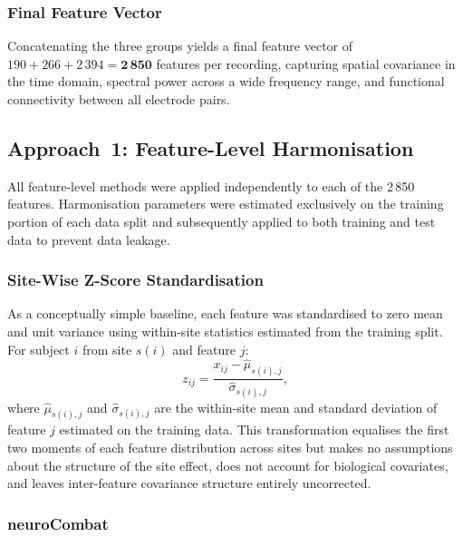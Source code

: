 \documentclass[preprint,12pt]{elsarticle}
\begin{document}
\subsubsection{Final Feature Vector}

Concatenating the three groups yields a final feature vector of
$190 + 266 + 2\,394 = \mathbf{2\,850}$ features per recording,
capturing spatial covariance in the time domain, spectral power
across a wide frequency range, and functional connectivity between
all electrode pairs.

\subsection{Approach~1: Feature-Level Harmonisation}
\label{subsec:approach1}

All feature-level methods were applied independently to each of the
2\,850 features.
Harmonisation parameters were estimated exclusively on the training
portion of each data split and subsequently applied to both training
and test data to prevent data leakage.

\subsubsection{Site-Wise Z-Score Standardisation}
\label{subsubsec:sitewise}

As a conceptually simple baseline, each feature was standardised to
zero mean and unit variance using within-site statistics estimated
from the training split.
For subject $i$ from site $s(i)$ and feature $j$:
\begin{equation}
  z_{ij} = \frac{x_{ij} - \hat{\mu}_{s(i),j}}
                {\hat{\sigma}_{s(i),j}},
  \label{eq:sitewise}
\end{equation}
where $\hat{\mu}_{s(i),j}$ and $\hat{\sigma}_{s(i),j}$ are the
within-site mean and standard deviation of feature $j$ estimated on
the training data.
This transformation equalises the first two moments of each feature
distribution across sites but makes no assumptions about the
structure of the site effect, does not account for biological
covariates, and leaves inter-feature covariance structure entirely
uncorrected.

\subsubsection{neuroCombat}
\label{subsubsec:neurocombat}
\end{document}
